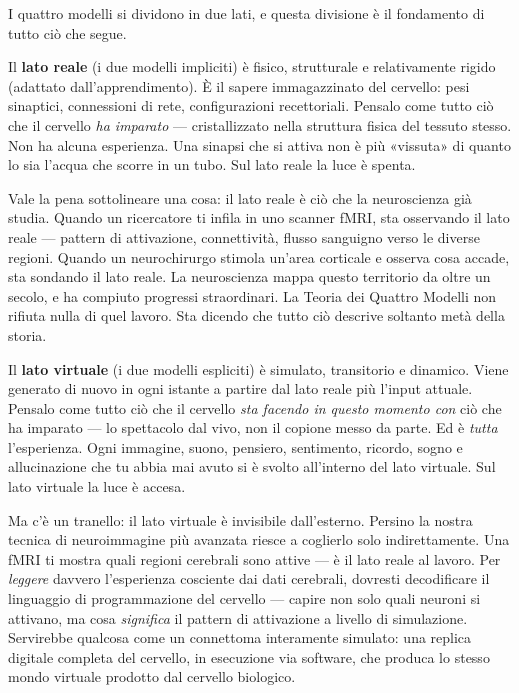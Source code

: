 \documentclass[11pt, twoside, openright]{book}
\begin{document}
I quattro modelli si dividono in due lati, e questa divisione è il fondamento di tutto ciò che segue.

Il \textbf{lato reale} (i due modelli impliciti) è fisico, strutturale e relativamente rigido (adattato dall'apprendimento). È il sapere immagazzinato del cervello: pesi sinaptici, connessioni di rete, configurazioni recettoriali. Pensalo come tutto ciò che il cervello \textit{ha imparato} --- cristallizzato nella struttura fisica del tessuto stesso. Non ha alcuna esperienza. Una sinapsi che si attiva non è più «vissuta» di quanto lo sia l'acqua che scorre in un tubo. Sul lato reale la luce è spenta.

Vale la pena sottolineare una cosa: il lato reale è ciò che la neuroscienza già studia. Quando un ricercatore ti infila in uno scanner fMRI, sta osservando il lato reale --- pattern di attivazione, connettività, flusso sanguigno verso le diverse regioni. Quando un neurochirurgo stimola un'area corticale e osserva cosa accade, sta sondando il lato reale. La neuroscienza mappa questo territorio da oltre un secolo, e ha compiuto progressi straordinari. La Teoria dei Quattro Modelli non rifiuta nulla di quel lavoro. Sta dicendo che tutto ciò descrive soltanto metà della storia.

Il \textbf{lato virtuale} (i due modelli espliciti) è simulato, transitorio e dinamico. Viene generato di nuovo in ogni istante a partire dal lato reale più l'input attuale. Pensalo come tutto ciò che il cervello \textit{sta facendo in questo momento con} ciò che ha imparato --- lo spettacolo dal vivo, non il copione messo da parte. Ed è \textit{tutta} l'esperienza. Ogni immagine, suono, pensiero, sentimento, ricordo, sogno e allucinazione che tu abbia mai avuto si è svolto all'interno del lato virtuale. Sul lato virtuale la luce è accesa.

Ma c'è un tranello: il lato virtuale è invisibile dall'esterno. Persino la nostra tecnica di neuroimmagine più avanzata riesce a coglierlo solo indirettamente. Una fMRI ti mostra quali regioni cerebrali sono attive --- è il lato reale al lavoro. Per \textit{leggere} davvero l'esperienza cosciente dai dati cerebrali, dovresti decodificare il linguaggio di programmazione del cervello --- capire non solo quali neuroni si attivano, ma cosa \textit{significa} il pattern di attivazione a livello di simulazione. Servirebbe qualcosa come un connettoma interamente simulato: una replica digitale completa del cervello, in esecuzione via software, che produca lo stesso mondo virtuale prodotto dal cervello biologico.
\end{document}
